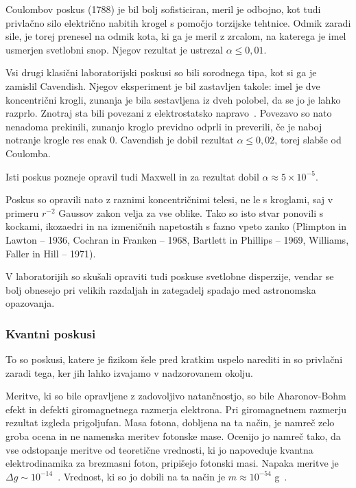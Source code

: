 \documentclass[a4paper, twocolumn, titlepage]{article}
\begin{document}
Coulombov poskus (1788) je bil bolj sofisticiran, meril je odbojno, kot tudi privlačno silo električno nabitih krogel s
pomočjo torzijske tehtnice. Odmik zaradi sile, je torej prenesel na odmik kota, ki ga je meril z zrcalom, na katerega je
imel usmerjen svetlobni snop. Njegov rezultat je ustrezal $\alpha \leq 0,01$.

Vsi drugi klasični laboratorijski poskusi so bili sorodnega tipa, kot si ga je zamislil Cavendish. Njegov eksperiment
je bil zastavljen takole: imel je dve koncentrični krogli, zunanja je bila sestavljena iz dveh polobel, da se jo je lahko
razprlo. Znotraj sta bili povezani z elektrostatsko napravo~\cite{over}. Povezavo so nato nenadoma prekinili, zunanjo kroglo
previdno odprli in preverili, če je naboj notranje krogle res enak 0. Cavendish je dobil rezultat $\alpha \leq 0,02$, torej
slabše od Coulomba.

Isti poskus pozneje opravil tudi Maxwell in za rezultat dobil $\alpha \approx 5 \times 10^{-5}$.

Poskus so opravili nato z raznimi koncentričnimi telesi, ne le s kroglami, saj v primeru $r^{-2}$ Gaussov zakon velja za vse
oblike. Tako so isto stvar ponovili s kockami, ikozaedri in na izmeničnih napetostih s fazno vpeto zanko (Plimpton in
Lawton -- 1936, Cochran in Franken -- 1968,  Bartlett in Phillips -- 1969, Williams, Faller in Hill -- 1971).

V laboratorijih so skušali opraviti tudi poskuse svetlobne disperzije, vendar se bolj obnesejo pri velikih razdaljah in
zategadelj spadajo med astronomska opazovanja.

\subsubsection{Kvantni poskusi}

To so poskusi, katere je fizikom šele pred kratkim uspelo narediti in so privlačni zaradi tega, ker jih lahko izvajamo v
nadzorovanem okolju.

Meritve, ki so bile opravljene z zadovoljivo natančnostjo, so bile Aharonov-Bohm efekt in defekti giromagnetnega razmerja
elektrona. Pri giromagnetnem razmerju rezultat izgleda prigoljufan. Masa fotona, dobljena na ta način, je namreč zelo groba
ocena in ne namenska meritev fotonske mase. Ocenijo jo namreč tako, da vse odstopanje meritve od teoretične vrednosti, ki jo
napoveduje kvantna elektrodinamika za brezmasni foton, pripišejo fotonski masi. Napaka meritve je
$\Delta g \sim 10^{-14}$~\cite{over}. Vrednost, ki so jo dobili na ta način je $m \approx 10^{-54}$ g~\cite{over}.
\end{document}
